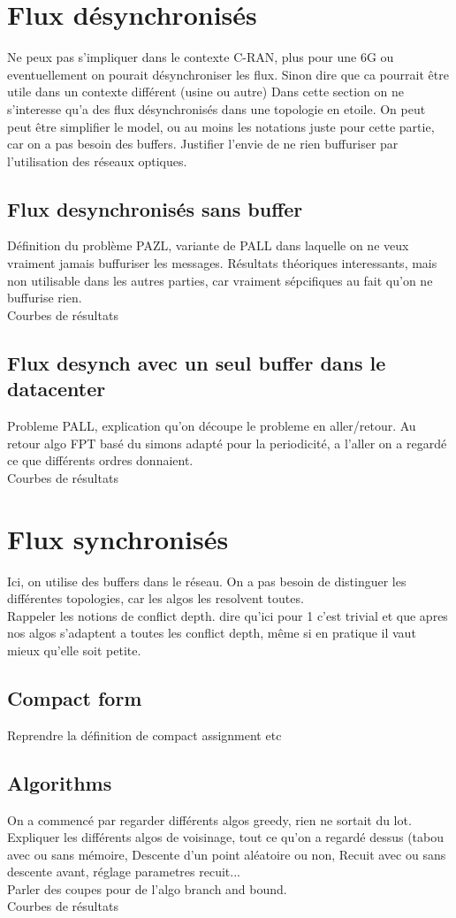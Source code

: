 \documentclass[a4paper,10pt]{article}
\begin{document}
 
\section{Flux désynchronisés}
Ne peux pas s'impliquer dans le contexte C-RAN, plus pour une 6G ou eventuellement on pourait désynchroniser les flux. Sinon dire que ca pourrait être utile dans un contexte différent (usine ou autre)
Dans cette section on ne s'interesse qu'a des flux désynchronisés dans une topologie en etoile.
On peut peut être simplifier le model, ou au moins les notations juste pour cette partie, car on a pas besoin  des buffers.
Justifier l'envie de ne rien buffuriser par l'utilisation des réseaux optiques.
\subsection{Flux desynchronisés sans buffer}
Définition du problème PAZL, variante de PALL dans laquelle on ne veux vraiment jamais buffuriser les messages.
Résultats théoriques interessants, mais non utilisable dans les autres parties, car vraiment sépcifiques au fait qu'on ne buffurise rien.\\
Courbes de résultats
\subsection{Flux desynch avec un seul buffer dans le datacenter}
Probleme PALL, explication qu'on découpe le probleme en aller/retour.
Au retour algo FPT basé du simons adapté pour la periodicité, a l'aller on a regardé ce que différents ordres donnaient.\\
Courbes de résultats
\section{Flux synchronisés}
Ici, on utilise des buffers dans le réseau. On a pas besoin de distinguer les différentes topologies, car les algos les resolvent toutes. \\
Rappeler les notions de conflict depth. dire qu'ici pour 1 c'est trivial et que apres nos algos s'adaptent a toutes les conflict depth, même si en pratique il vaut mieux qu'elle soit petite.
\subsection{Compact form}
Reprendre la définition de compact assignment etc
\subsection{Algorithms}
On a commencé par regarder différents algos greedy, rien ne sortait du lot.
Expliquer les différents algos de voisinage, tout ce qu'on a regardé dessus (tabou avec ou sans mémoire, Descente d'un point aléatoire ou non, Recuit avec ou sans descente avant, réglage parametres recuit...\\
Parler des coupes pour de l'algo branch and bound.\\
Courbes de résultats
\end{document}
